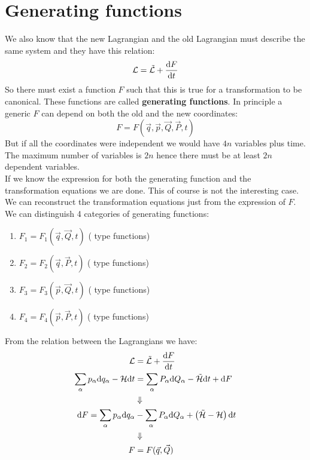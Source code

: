 \section{Generating functions}
We also know that the new Lagrangian and the old Lagrangian must describe the same system and they have this relation:
\begin{equation}
    \mathcal{L} = \tilde{\mathcal{L}}+\dfrac{\mathrm{d}F }{\mathrm{d}t}
\end{equation}
So there must exist a function $F$ such that this is true for a transformation to be canonical. These functions are called \textbf{generating functions}.
In principle a generic $F$ can depend on both the old and the new coordinates:
\begin{equation}
    F = F(\vec{q},\vec{p},\vec{Q},\vec{P},t)
\end{equation}
But if all the coordinates were independent we would have $4n$ variables plus time. The maximum number of variables is $2n$ hence there must be at least $2n$ dependent variables.\\
If we know the expression for both the generating function and the transformation equations we are done. This of course is not the interesting case. We can reconstruct the transformation equations just from the expression of $F$. We can distinguish 4 categories of generating functions:
\begin{enumerate}
    \item $F_1 = F_1(\vec{q},\vec{Q},t)$ ( type functions)
    \item $F_2 = F_2(\vec{q},\vec{P},t)$ (  type functions)
    \item $F_3 = F_3(\vec{p},\vec{Q},t)$ (  type functions)
    \item $F_4 = F_4(\vec{p},\vec{P},t)$ (  type functions)
\end{enumerate}
From the relation between the Lagrangians we have:
\begin{equation}
    \begin{split}
        \mathcal{L} &= \tilde{\mathcal{L}}+\dfrac{\mathrm{d}F }{\mathrm{d}t}\\
        \displaystyle\sum_{\alpha}p_{\alpha}\mathrm{d}q_{\alpha} - \mathcal{H}\mathrm{d}t &= \displaystyle\sum_{\alpha}P_{\alpha}\mathrm{d}Q_{\alpha} - \tilde{\mathcal{H}}\mathrm{d}t + \mathrm{d}F\\
        &\Downarrow \\
        \mathrm{d}F = \displaystyle\sum_{\alpha}p_{\alpha}\mathrm{d}q_{\alpha} &- \displaystyle\sum_{\alpha}P_{\alpha}\mathrm{d}Q_{\alpha} + \left(\tilde{\mathcal{H}}- \mathcal{H}\right)\mathrm{d}t\\
        &\Downarrow \\
        F &= F(\vec{q},\vec{Q})
    \end{split}
\end{equation}

